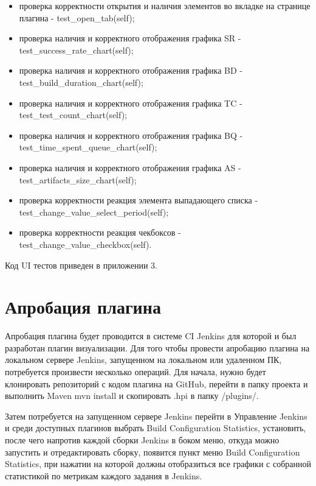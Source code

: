 \begin{itemize}
	\item проверка корректности открытия и наличия элементов во вкладке на странице плагина - test\_open\_tab(self);
	\item проверка наличия и корректного отображения графика SR - test\_success\_rate\_chart(self);
	\item проверка наличия и корректного отображения графика BD - test\_build\_duration\_chart(self);
	\item проверка наличия и корректного отображения графика TC - test\_test\_count\_chart(self);
	\item проверка наличия и корректного отображения графика BQ - test\_time\_spent\_queue\_chart(self);
	\item проверка наличия и корректного отображения графика AS - test\_artifacts\_size\_chart(self);
	\item проверка корректности реакция элемента выпадающего списка - test\_change\_value\_select\_period(self);
	\item проверка  корректности реакция чекбоксов - test\_change\_value\_checkbox(self).
\end{itemize}

Код UI тестов приведен в приложении 3.



 \section{Апробация плагина} \label{ch4:sec2}
 
 Апробация плагина будет проводится в системе CI Jenkins для которой и был разработан плагин визуализации. Для того чтобы провести апробацию плагина на локальном сервере Jenkins, запущенном на локальном или удаленном ПК, потребуется произвести несколько операций. Для начала, нужно будет клонировать репозиторий с кодом плагина на GitHub, перейти в папку проекта и выполнить \cite{deployplugin} Maven mvn install и скопировать .hpi в папку /plugins/. 
 
 Затем потребуется на запущенном сервере Jenkins перейти в Управление Jenkins  и среди доступных плагинов выбрать Build Configuration Statistics, установить, после чего напротив каждой сборки Jenkins в боком меню, откуда можно запустить и отредактировать сборку, появится пункт меню Build Configuration Statistics, при нажатии на которой должны отобразиться все графики с собранной статистикой по метрикам каждого задания в Jenkins. 
 
